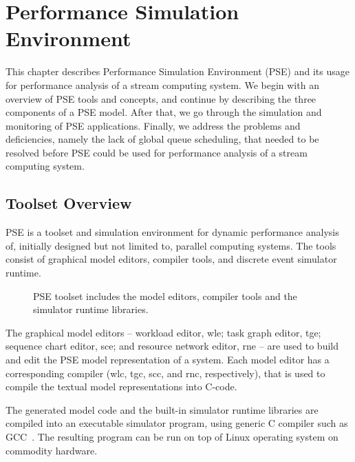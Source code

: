 \chapter{Performance Simulation Environment}
\label{chapter:performance-simulation-environment}

This chapter describes Performance Simulation Environment (PSE) and its usage for performance analysis of a stream computing system. We begin with an overview of PSE tools and concepts, and continue by describing the three components of a PSE model. After that, we go through the simulation and monitoring of PSE applications. Finally, we address the problems and deficiencies, namely the lack of global queue scheduling, that needed to be resolved before PSE could be used for performance analysis of a stream computing system.

\section{Toolset Overview}
\label{sec:toolset-overview}

PSE is a toolset and simulation environment for dynamic performance analysis of, initially designed but not limited to, parallel computing systems. The tools consist of graphical model editors, compiler tools, and discrete event simulator runtime.

\begin{figure}[ht]
  \begin{center}
    \caption{PSE toolset includes the model editors, compiler tools and the simulator runtime libraries.}
    \label{fig:pse-toolset}
  \end{center}
\end{figure}

The graphical model editors -- workload editor, wle; task graph editor, tge; sequence chart editor, sce; and resource network editor, rne -- are used to build and edit the PSE model representation of a system. Each model editor has a corresponding compiler (wlc, tgc, scc, and rnc, respectively), that is used to compile the textual model representations into C-code.

The generated model code and the built-in simulator runtime libraries are compiled into an executable simulator program, using generic C compiler such as GCC~\cite{stallman:2009:gcc}. The resulting program can be run on top of Linux operating system on commodity hardware.

